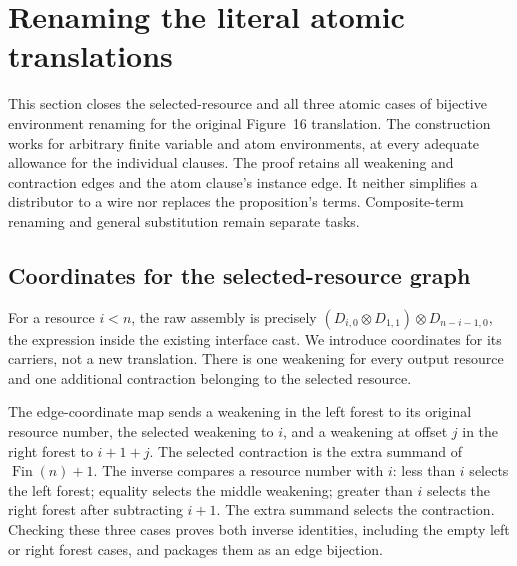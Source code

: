 \clearpage
\section{Renaming the literal atomic translations}
\label{sec:copying-atomic-renaming}
This section closes the selected-resource and all three atomic cases of
bijective environment renaming for the original Figure~16 translation.
The construction works for arbitrary finite variable and atom environments,
at every adequate allowance for the individual clauses. The proof retains
all weakening and contraction edges and the atom clause's instance edge.
It neither simplifies a distributor to a wire nor replaces the proposition's
terms. Composite-term renaming and general substitution remain separate tasks.

\subsection{Coordinates for the selected-resource graph}
For a resource $i<n$, the raw assembly is precisely
$(D_{i,0}\otimes D_{1,1})\otimes D_{n-i-1,0}$, the expression inside the
existing interface cast. We introduce coordinates for its carriers, not a
new translation. There is one weakening for every output resource and one
additional contraction belonging to the selected resource.


The edge-coordinate map sends a weakening in the left forest to its original
resource number, the selected weakening to $i$, and a weakening at offset $j$
in the right forest to $i+1+j$. The selected contraction is the extra summand
of $\operatorname{Fin}(n)+1$. The inverse compares a resource number with $i$:
less than $i$ selects the left forest; equality selects the middle weakening;
greater than $i$ selects the right forest after subtracting $i+1$. The extra
summand selects the contraction. Checking these three cases proves both
inverse identities, including the empty left or right forest cases, and
packages them as an edge bijection.


